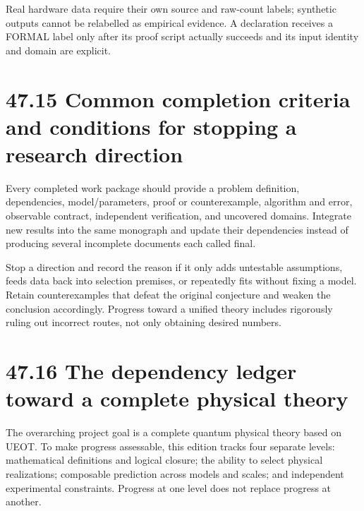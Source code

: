 \documentclass[
  11pt,
  oneside]{book}
\begin{document}
Real hardware data require their own source and raw-count labels;
synthetic outputs cannot be relabelled as empirical evidence. A
declaration receives a FORMAL label only after its proof script actually
succeeds and its input identity and domain are explicit.

\section{47.15 Common completion criteria and conditions for stopping a
research direction}

Every completed work package should provide a problem definition,
dependencies, model/parameters, proof or counterexample, algorithm and
error, observable contract, independent verification, and uncovered
domains. Integrate new results into the same monograph and update their
dependencies instead of producing several incomplete documents each
called final.

Stop a direction and record the reason if it only adds untestable
assumptions, feeds data back into selection premises, or repeatedly fits
without fixing a model. Retain counterexamples that defeat the original
conjecture and weaken the conclusion accordingly. Progress toward a
unified theory includes rigorously ruling out incorrect routes, not only
obtaining desired numbers.

\section{47.16 The dependency ledger toward a complete physical theory}

The overarching project goal is a complete quantum physical theory based
on UEOT. To make progress assessable, this edition tracks four separate
levels: mathematical definitions and logical closure; the ability to
select physical realizations; composable prediction across models and
scales; and independent experimental constraints. Progress at one level
does not replace progress at another.
\end{document}
